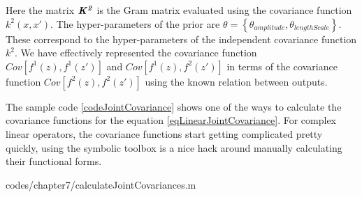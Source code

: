 Here the matrix $\bm{\mathit{K^2}}$ is the Gram matrix evaluated using the covariance function $k^2(x, x')$. The hyper-parameters of the prior are \(\theta = \left \{ \theta_{amplitude}, \theta_{lengthScale} \right \}\). These correspond to the hyper-parameters of the independent covariance function \(k^{2}\). We have effectively represented the covariance function \(Cov[f^1(z), f^1(z')]\) and \(Cov[f^1(z), f^2(z')]\) in terms of the covariance function $Cov[f^2(z), f^2(z')]$ using the known relation between outputs. 

The sample code \ref{codeJointCovariance} shows one of the ways to calculate the covariance functions for the equation \ref{eqLinearJointCovariance}. For complex linear operators, the covariance functions start getting complicated pretty quickly, using the symbolic toolbox is a nice hack around manually calculating their functional forms. 

\begin{mdframed}[hidealllines=true,backgroundcolor=lightgray!20]
            {codes/chapter7/calculateJointCovariances.m}
\end{mdframed}

